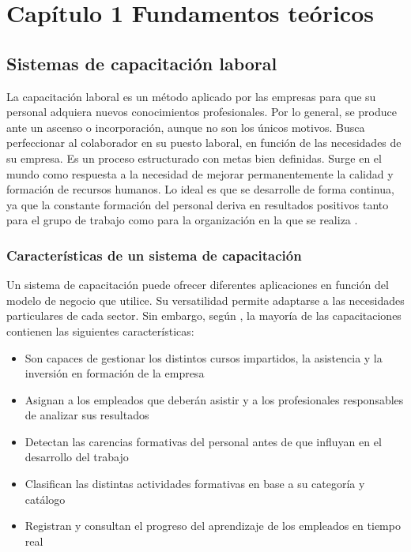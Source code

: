 \chapter*{Capítulo 1 \vspace{0.5cm} \break Fundamentos teóricos}
\setcounter{chapter}{1}


\section{Sistemas de capacitación laboral}
La capacitación laboral es un método aplicado por las empresas para que su personal adquiera nuevos conocimientos profesionales. Por lo general, se produce ante un ascenso o incorporación, aunque no son los únicos motivos. Busca perfeccionar al colaborador en su puesto laboral, en función de las necesidades de su empresa. Es un proceso estructurado con metas bien definidas. Surge en el mundo como respuesta a la necesidad de mejorar permanentemente la calidad y formación de recursos humanos. Lo ideal es que se desarrolle de forma continua, ya que la constante formación del personal deriva en resultados positivos tanto para el grupo de trabajo como para la organización en la que se realiza \cite{Denby2010}.

\subsection{Características de un sistema de capacitación}
Un sistema de capacitación puede ofrecer diferentes aplicaciones en función del modelo de negocio que utilice. Su versatilidad permite adaptarse a las necesidades particulares de cada sector. Sin embargo, según \cite{Paez2022}, la mayoría de las capacitaciones contienen las siguientes características:

\begin{itemize}
\item Son capaces de gestionar los distintos cursos impartidos, la asistencia y la inversión en formación de la empresa
\item Asignan a los empleados que deberán asistir y a los profesionales responsables de analizar sus resultados
\item Detectan las carencias formativas del personal antes de que influyan en el desarrollo del trabajo
\item Clasifican las distintas actividades formativas en base a su categoría y catálogo
\item Registran y consultan el progreso del aprendizaje de los empleados en tiempo real
\end{itemize}

